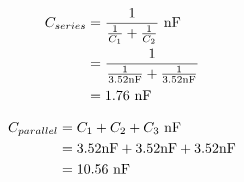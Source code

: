 \documentclass{article}
\begin{document}

\begin{align*}
    C_{series} &= \frac{1}{\frac{1}{C_1} + \frac{1}{C_2}} \ \textnormal{nF} \\
    &= \frac{1}{\frac{1}{3.52 \textnormal{nF}} + \frac{1}{3.52 \textnormal{nF}}} \\
    &= 1.76 \ \textnormal{nF} \\
\end{align*}

\begin{align*}
    C_{parallel} &= C_1 + C_2 + C_3 \ \textnormal{nF} \\
    &= 3.52 \textnormal{nF} + 3.52 \textnormal{nF} + 3.52 \textnormal{nF} \\
    &= 10.56 \ \textnormal{nF} \\
\end{align*}
\end{document}
